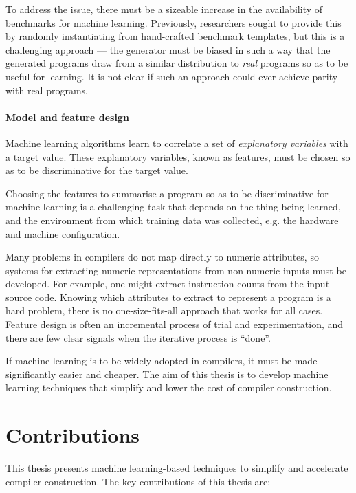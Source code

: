 To address the issue, there must be a sizeable increase in the availability of benchmarks for machine learning. Previously, researchers sought to provide this by randomly instantiating from hand-crafted benchmark templates, but this is a challenging approach --- the generator must be biased in such a way that the generated programs draw from a similar distribution to \emph{real} programs so as to be useful for learning. It is not clear if such an approach could ever achieve parity with real programs.

\paragraph*{Model and feature design} Machine learning algorithms learn to correlate a set of \emph{explanatory variables} with a target value. These explanatory variables, known as features, must be chosen so as to be discriminative for the target value.

Choosing the features to summarise a program so as to be discriminative for machine learning is a challenging task that depends on the thing being learned, and the environment from which training data was collected, e.g. the hardware and machine configuration.

Many problems in compilers do not map directly to numeric attributes, so systems for extracting numeric representations from non-numeric inputs must be developed. For example, one might extract instruction counts from the input source code. Knowing which attributes to extract to represent a program is a hard problem, there is no one-size-fits-all approach that works for all cases. Feature design is often an incremental process of trial and experimentation, and there are few clear signals when the iterative process is ``done''.

If machine learning is to be widely adopted in compilers, it must be made significantly easier and cheaper. The aim of this thesis is to develop machine learning techniques that simplify and lower the cost of compiler construction.



\section{Contributions}

This thesis presents machine learning-based techniques to simplify and accelerate compiler construction. The key contributions of this thesis are:

